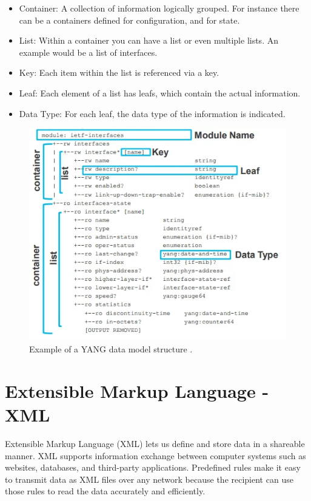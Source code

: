 \begin{itemize}
    \item Container: A collection of information logically grouped. For instance there can be a containers defined for configuration, and for state.
    \item List: Within a container you can have a list or even multiple lists. An example would be a list of interfaces.
    \item Key: Each item within the list is referenced via a key.
    \item Leaf: Each element of a list has leafs, which contain the actual information.
    \item Data Type: For each leaf, the data type of the information is indicated.
\end{itemize}

\pagebreak

\begin{figure}[h]
    \centering
    \includegraphics[width=0.7\linewidth]{Images/yang.jpg}
    \caption{Example of a YANG data model structure \cite{NETCONFYANG}.}
    \label{fig:yangModels}
\end{figure}




\section{Extensible Markup Language - XML}
Extensible Markup Language (XML) lets us define and store data in a shareable manner. XML supports information exchange between computer systems such as websites, databases, and third-party applications. Predefined rules make it easy to transmit data as XML files over any network because the recipient can use those rules to read the data accurately and efficiently.

